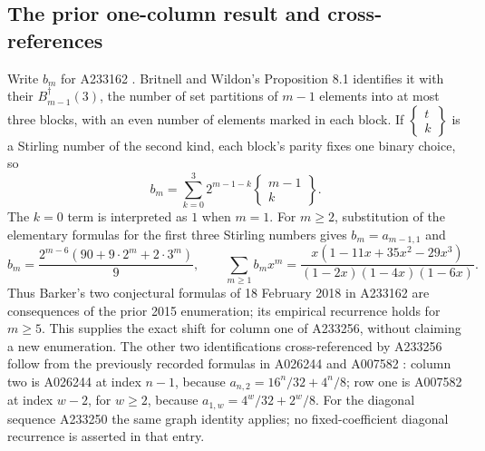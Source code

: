 \documentclass[11pt]{article}
\begin{document}
\subsection{The prior one-column result and cross-references}
Write $b_m$ for A233162 \cite{onecolumn}. Britnell and Wildon's
Proposition 8.1 identifies it with their $B^\dagger_{m-1}(3)$, the number
of set partitions of $m-1$ elements into at most three blocks, with an even
number of elements marked in each block. If
$\left\{\begin{smallmatrix}t\\k\end{smallmatrix}\right\}$ is a Stirling
number of the second kind, each block's parity fixes one binary choice, so
\[
b_m=\sum_{k=0}^3 2^{m-1-k}
\left\{\begin{smallmatrix}m-1\\k\end{smallmatrix}\right\}.
\]
The $k=0$ term is interpreted as $1$ when $m=1$.
For $m\ge2$, substitution of the elementary formulas for the first three
Stirling numbers gives $b_m=a_{m-1,1}$ and
\[
b_m=\frac{2^{m-6}(90+9\cdot2^m+2\cdot3^m)}9,\qquad
\sum_{m\ge1}b_mx^m=
\frac{x(1-11x+35x^2-29x^3)}{(1-2x)(1-4x)(1-6x)}.
\]
Thus Barker's two conjectural formulas of 18 February 2018 in A233162
are consequences of the prior 2015 enumeration; its empirical recurrence
holds for $m\ge5$. This supplies the exact shift for column one of A233256,
without claiming a new enumeration.
The other two identifications cross-referenced by A233256 follow from
the previously recorded formulas in A026244 \cite{knownwidthtwo} and
A007582 \cite{knownrowone}: column two is A026244 at index $n-1$, because
$a_{n,2}=16^n/32+4^n/8$; row one is A007582 at index $w-2$, for $w\ge2$,
because $a_{1,w}=4^w/32+2^w/8$.
For the diagonal sequence A233250 the same graph identity applies;
no fixed-coefficient diagonal recurrence is asserted in that entry.
\end{document}
